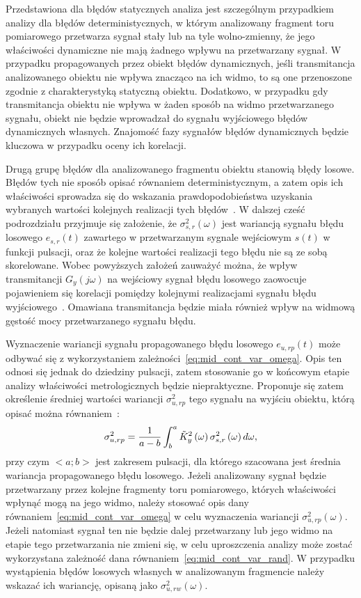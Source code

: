 Przedstawiona dla błędów statycznych analiza jest szczególnym przypadkiem analizy dla błędów deterministycznych, w którym analizowany fragment toru pomiarowego przetwarza sygnał stały lub na tyle wolno-zmienny, że jego właściwości dynamiczne nie mają żadnego wpływu na przetwarzany sygnał. W przypadku propagowanych przez obiekt błędów dynamicznych, jeśli transmitancja analizowanego obiektu nie wpływa znacząco na ich widmo, to są one przenoszone zgodnie z charakterystyką statyczną obiektu. Dodatkowo, w przypadku gdy transmitancja obiektu nie wpływa w żaden sposób na widmo przetwarzanego sygnału, obiekt nie będzie wprowadzał do sygnału wyjściowego błędów dynamicznych własnych. Znajomość fazy sygnałów błędów dynamicznych będzie kluczowa w przypadku oceny ich korelacji.

Drugą grupę błędów dla analizowanego fragmentu obiektu stanowią błędy losowe. Błędów tych nie sposób opisać równaniem deterministycznym, a zatem opis ich właściwości sprowadza się do wskazania prawdopodobieństwa uzyskania wybranych wartości kolejnych realizacji tych błędów~\cite{jcgm_guide, jakubiec_system}. W dalszej cześć podrozdziału przyjmuje się założenie, że $\sigma_{s,r}^{2}(\omega)$ jest wariancją sygnału błędu losowego $e_{s,r}(t)$ zawartego w przetwarzanym sygnale wejściowym $s(t)$ w funkcji pulsacji, oraz że kolejne wartości realizacji tego błędu nie są ze sobą skorelowane. Wobec powyższych założeń zauważyć można, że wpływ transmitancji $G_{y}(j\omega)$ na wejściowy sygnał błędu losowego zaowocuje pojawieniem się korelacji pomiędzy kolejnymi realizacjami sygnału błędu wyjściowego~\cite{jadziak_dsp, bibbona_filter, benassi_filter}. Omawiana transmitancja będzie miała również wpływ na widmową gęstość mocy przetwarzanego sygnału błędu.

Wyznaczenie wariancji sygnału propagowanego błędu losowego $e_{u,rp}(t)$ może odbywać się z wykorzystaniem zależności~\eqref{eq:mid_cont_var_omega}. Opis ten odnosi się jednak do dziedziny pulsacji, zatem stosowanie go w końcowym etapie analizy właściwości metrologicznych będzie niepraktyczne. Proponuje się zatem określenie średniej wartości wariancji $\sigma_{u,rp}^{2}$ tego sygnału na wyjściu obiektu, którą opisać można równaniem~\cite{jadziak_dsp, proakis_dsp}:
\begin{equation}
\sigma_{u,rp}^{2} = \frac{1}{a - b} \int _{b} ^{a} \tilde{K}_{y}^{2} \left(\omega\right) \sigma_{s,r}^{2} \left(\omega\right) d\omega \label{eq:mid_cont_var_rand},
\end{equation}
przy czym $<a;b>$ jest zakresem pulsacji, dla którego szacowana jest średnia wariancja propagowanego błędu losowego. Jeżeli analizowany sygnał będzie przetwarzany przez kolejne fragmenty toru pomiarowego, których właściwości wpłynąć mogą na jego widmo, należy stosować opis dany równaniem~\eqref{eq:mid_cont_var_omega} w celu wyznaczenia wariancji $\sigma_{u,rp}^{2}(\omega)$. Jeżeli natomiast sygnał ten nie będzie dalej przetwarzany lub jego widmo na etapie tego przetwarzania nie zmieni się, w celu uproszczenia analizy może zostać wykorzystana zależność dana równaniem~\eqref{eq:mid_cont_var_rand}. W przypadku wystąpienia błędów losowych własnych w analizowanym fragmencie należy wskazać ich wariancję, opisaną jako $\sigma_{u,rw}^{2}(\omega)$.


